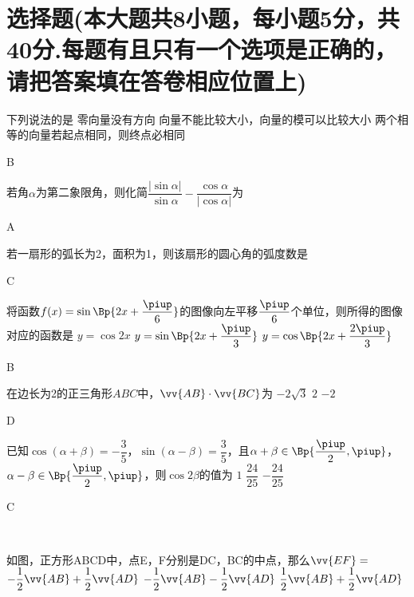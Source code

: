 \section{选择题(本大题共8小题，每小题5分，共40分.每题有且只有一个选项是正确的，请把答案填在答卷相应位置上)}
  \item
    下列说法的是\xz
       {零向量没有方向}
       {向量不能比较大小，向量的模可以比较大小}
       {两个相等的向量若起点相同，则终点必相同}
    \begin{answer}
      B
    \end{answer}
  \item
    若角$\alpha$为第二象限角，则化简$\dfrac{|\sin\alpha|}{\sin\alpha}-\dfrac{\cos\alpha}{|\cos\alpha|}$为\xz
    \begin{answer}
      A
    \end{answer}
  \item
    若一扇形的弧长为2，面积为1，则该扇形的圆心角的弧度数是\xz
    \begin{answer}
      C
    \end{answer}
  \item
    将函数$f(x)=\sin\Bp{2x+\dfrac{\piup}6}$的图像向左平移$\dfrac{\piup}6$个单位，则所得的图像对应的函数是\xz
       {$y=\cos{2x}$}
       {$y=\sin\Bp{2x+\dfrac{\piup}3}$}
       {$y=\cos\Bp{2x+\dfrac{2\piup}3}$}
    \begin{answer}
      B
    \end{answer}
  \item
    在边长为2的正三角形$ABC$中，$\vv{AB}\cdot\vv{BC}$为\xz
        {$-2\sqrt3$}
        {$2$}
        {$-2$}
    \begin{answer}
      D
    \end{answer}
  \item
    已知$\cos(\alpha+\beta)=-\dfrac35$，$\sin(\alpha-\beta)=\dfrac35$，且$\alpha+\beta\in\Bp{\dfrac{\piup}2,\piup}$，$\alpha-\beta\in\Bp{\dfrac{\piup}2,\piup}$，则$\cos{2\beta}$的值为\xz
       {$1$}
       {$\dfrac{24}{25}$}
       {$-\dfrac{24}{25}$}
    \begin{answer}
      C
    \end{answer}
  \\\begin{minipage}[htbp!]{0.7\linewidth}\item
    如图，正方形ABCD中，点E，F分别是DC，BC的中点，那么$\vv{EF}=$\xz
     {$-\dfrac12\vv{AB}+\dfrac12\vv{AD}$}
     {$-\dfrac12\vv{AB}-\dfrac12\vv{AD}$}
     {$\dfrac12\vv{AB}+\dfrac12\vv{AD}$}
    \end{minipage}
